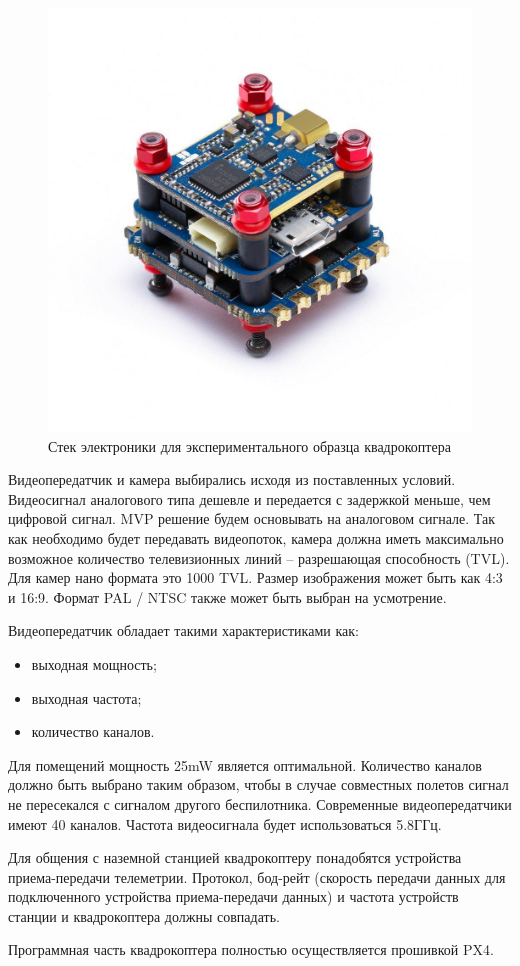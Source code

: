 \begin{figure}[H]
	\centering
	\includegraphics[width=0.5\linewidth]{../RW/pics/stack}
	\caption{Стек электроники для экспериментального образца квадрокоптера
	}
	\label{fig:stack} %
\end{figure}

Видеопередатчик и камера выбирались исходя из поставленных условий. Видеосигнал аналогового типа дешевле и передается с задержкой меньше, чем цифровой сигнал. MVP решение будем основывать на аналоговом сигнале. Так как необходимо будет передавать видеопоток, камера должна иметь максимально возможное количество телевизионных линий -- разрешающая способность (TVL). Для камер нано формата это 1000 TVL. Размер изображения может быть как 4:3 и 16:9. Формат PAL / NTSC также может быть выбран на усмотрение.

Видеопередатчик обладает такими характеристиками как:
\begin{itemize}
	\item выходная мощность;
	\item выходная частота;
	\item количество каналов.
\end{itemize}

Для помещений мощность 25mW является оптимальной. Количество каналов должно быть выбрано таким образом, чтобы в случае совместных полетов сигнал не пересекался с сигналом другого беспилотника. Современные видеопередатчики имеют 40 каналов. Частота видеосигнала будет использоваться 5.8ГГц.

Для общения с наземной станцией квадрокоптеру понадобятся устройства приема-передачи телеметрии. Протокол, бод-рейт (скорость передачи данных для подключенного устройства приема-передачи данных) и частота устройств станции и квадрокоптера должны совпадать.

Программная часть квадрокоптера полностью осуществляется прошивкой PX4.

